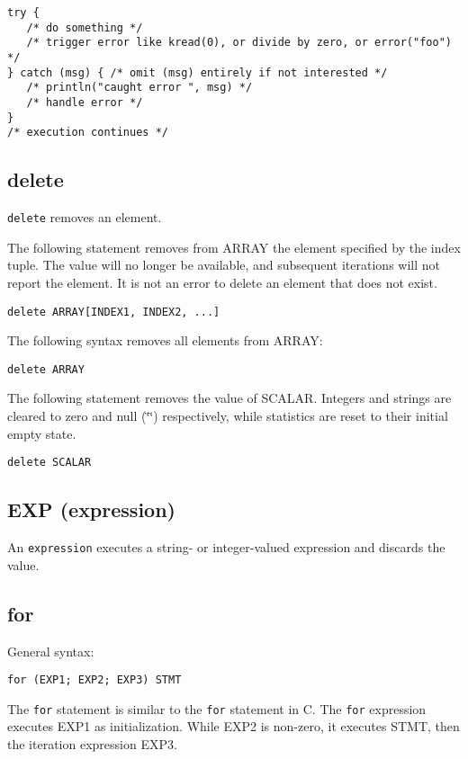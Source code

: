 \documentclass[twoside,english]{article}
\newenvironment{vindent}
{\begin{list}{}{\setlength{\listparindent}{6pt}}
\item[]}
{\end{list}}
\begin{document}
\begin{vindent}
\begin{verbatim}
try { 
   /* do something */
   /* trigger error like kread(0), or divide by zero, or error("foo") */
} catch (msg) { /* omit (msg) entirely if not interested */
   /* println("caught error ", msg) */
   /* handle error */
}
/* execution continues */
\end{verbatim}
\end{vindent}


\subsection{delete}
\texttt{delete} removes an element.

The following statement removes from ARRAY the element specified by the index
tuple. The value will no longer be available, and subsequent iterations will
not report the element. It is not an error to delete an element that does
not exist.

\begin{vindent}
\begin{verbatim}
delete ARRAY[INDEX1, INDEX2, ...]
\end{verbatim}
\end{vindent}
The following syntax removes all elements from ARRAY:

\begin{vindent}
\begin{verbatim}
delete ARRAY
\end{verbatim}
\end{vindent}
The following statement removes the value of SCALAR. Integers and strings
are cleared to zero and null (\char`\"{}\char`\"{}) respectively, while statistics
are reset to their initial empty state.

\begin{vindent}
\begin{verbatim}
delete SCALAR
\end{verbatim}
\end{vindent}

\subsection{EXP (expression)}
An \texttt{expression} executes a string- or integer-valued expression and
discards the value.


\subsection{for}
General syntax:
\begin{vindent}
\begin{verbatim}
for (EXP1; EXP2; EXP3) STMT
\end{verbatim}
\end{vindent}
The \texttt{for} statement is similar to the \texttt{for} statement in C.
The \texttt{for} expression executes EXP1 as initialization. While EXP2 is
non-zero, it executes STMT, then the iteration expression EXP3.
\end{document}
